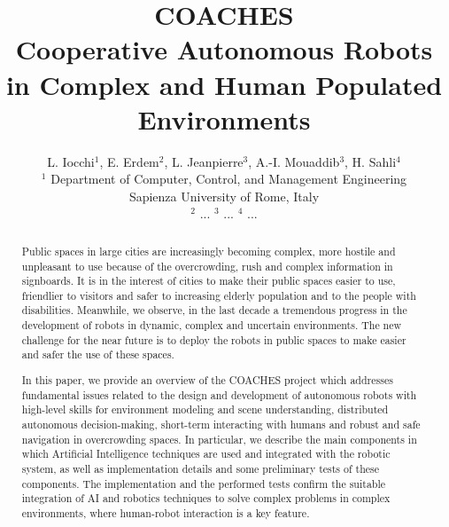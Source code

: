 \documentclass{llncs}
\def\coaches{ {\bf COACHES}}
\begin{document}
%
%
%
%
\title{\coaches\\
Cooperative Autonomous Robots in Complex and Human Populated Environments}
%
%
\author{L. Iocchi$^1$,  E. Erdem$^2$,  L. Jeanpierre$^3$, A.-I. Mouaddib$^3$, H. Sahli$^4$ \\
$^1$ Department of Computer, Control, and Management Engineering\\ 
Sapienza University of Rome, Italy\\
$^2$ ...
$^3$ ...
$^4$ ...
}

\institute{}
\date{}

%
%

\maketitle              %

\begin{abstract}

Public spaces in large cities are increasingly becoming complex, more hostile and  
unpleasant to use because of the overcrowding, rush and complex information in signboards. 
It is in the interest of cities to make their public spaces easier to use, friendlier to visitors and safer to increasing elderly population and to the people with disabilities. 
Meanwhile, we observe, in the last decade a tremendous progress in the development of robots in dynamic, complex and uncertain environments. The new challenge for the near future is to deploy the robots in public spaces to make easier and safer the use of these spaces. 

In this paper, we provide an overview of the COACHES project which addresses fundamental issues related to the design and development of autonomous robots with high-level skills for environment modeling and scene understanding, distributed autonomous decision-making, short-term interacting with humans and robust and safe navigation in overcrowding spaces. 
In particular, we describe the main components in which Artificial Intelligence techniques are used and integrated with the robotic system, as well as implementation details and some preliminary tests of these components. The implementation and the performed tests confirm the suitable integration of AI and robotics techniques to solve complex problems in complex environments, where human-robot interaction is a key feature.

\end{abstract}
\end{document}
